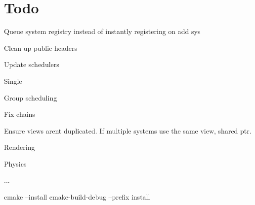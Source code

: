 \chapter{Todo }
\hypertarget{md_todo}{}\label{md_todo}
\label{md_todo_autotoc_md2}%
%



\begin{DoxyItemize}
\item Queue system registry instead of instantly registering on add sys
\item Clean up public headers
\item Update schedulers
\begin{DoxyItemize}
\item Single
\item Group scheduling
\item Fix chains
\end{DoxyItemize}
\item Ensure views aren\textquotesingle{}t duplicated. If multiple systems use the same view, shared ptr.
\item Rendering
\item Physics
\item ...
\item cmake --install cmake-\/build-\/debug --prefix install 
\end{DoxyItemize}